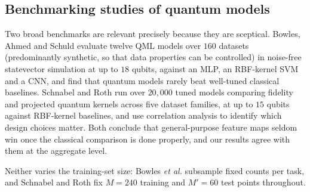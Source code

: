 \subsection{Benchmarking studies of quantum models}
\begin{revbody}

Two broad benchmarks are relevant precisely because they are sceptical. Bowles,
Ahmed and Schuld \cite{bowles2024} evaluate twelve QML models over $160$ datasets
(predominantly synthetic, so that data properties can be controlled) in
noise-free statevector simulation at up to $18$ qubits, against an MLP, an
RBF-kernel SVM and a CNN, and find that quantum models rarely beat well-tuned
classical baselines. Schnabel and Roth \cite{schnabel2024} run over $20{,}000$
tuned models comparing fidelity and projected quantum kernels across five
dataset families, at up to $15$ qubits against RBF-kernel baselines, and use
correlation analysis to identify which design choices matter. Both conclude that
general-purpose feature maps seldom win once the classical comparison is done
properly, and our results agree with them at the aggregate level.

Neither varies the training-set size: Bowles \emph{et al.} subsample fixed
counts per task, and Schnabel and Roth fix $M=240$ training and $M'=60$ test
points throughout.


\end{revbody}
